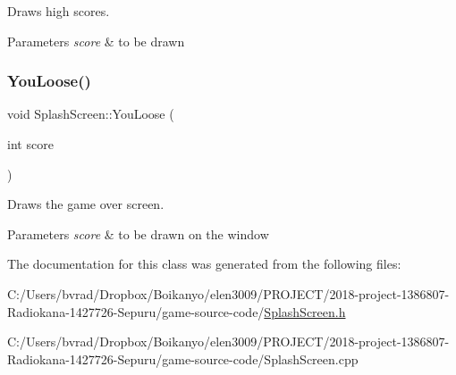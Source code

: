 Draws high scores. 


\begin{DoxyParams}{Parameters}
{\em score} & to be drawn \\
\hline
\end{DoxyParams}
\mbox{\label{class_splash_screen_a0fec044f81b02f9ba6c94ca9ed01d100}} 
\subsubsection{\texorpdfstring{You\+Loose()}{YouLoose()}}
{\footnotesize\ttfamily void Splash\+Screen\+::\+You\+Loose (\begin{DoxyParamCaption}\item[{int}]{score }\end{DoxyParamCaption})}



Draws the game over screen. 


\begin{DoxyParams}{Parameters}
{\em score} & to be drawn on the window \\
\hline
\end{DoxyParams}


The documentation for this class was generated from the following files\+:\begin{DoxyCompactItemize}
\item 
C\+:/\+Users/bvrad/\+Dropbox/\+Boikanyo/elen3009/\+P\+R\+O\+J\+E\+C\+T/2018-\/project-\/1386807-\/\+Radiokana-\/1427726-\/\+Sepuru/game-\/source-\/code/\mbox{\hyperlink{_splash_screen_8h}{Splash\+Screen.\+h}}\item 
C\+:/\+Users/bvrad/\+Dropbox/\+Boikanyo/elen3009/\+P\+R\+O\+J\+E\+C\+T/2018-\/project-\/1386807-\/\+Radiokana-\/1427726-\/\+Sepuru/game-\/source-\/code/Splash\+Screen.\+cpp\end{DoxyCompactItemize}
